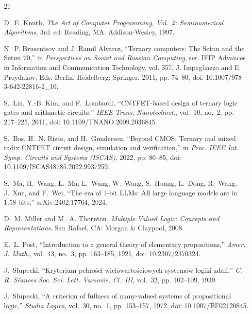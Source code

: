 \documentclass[conference]{IEEEtran}
\theoremstyle{remark}
\begin{document}
	\begin{thebibliography}{21}
		\providecommand{\url}[1]{#1}
		
		D.~E. Knuth, \emph{The Art of Computer Programming, Vol.~2: Seminumerical Algorithms}, 3rd~ed. Reading, MA: Addison-Wesley, 1997.
		
		N.~P. Brusentsov and J. Ramil Alvarez, ``Ternary computers: The Setun and the Setun 70,'' in \emph{Perspectives on Soviet and Russian Computing}, ser. IFIP Advances in Information and Communication Technology, vol. 357, J. Impagliazzo and E. Proydakov, Eds. Berlin, Heidelberg: Springer, 2011, pp. 74--80, doi: 10.1007/978-3-642-22816-2\_10.
		
		S.~Lin, Y.-B. Kim, and F.~Lombardi, ``{CNTFET}-based design of ternary logic gates and arithmetic circuits,'' \emph{IEEE Trans. Nanotechnol.}, vol.~10, no.~2, pp. 217--225, 2011, doi: 10.1109/TNANO.2009.2036845.
		
		S.~Bos, H.~N. Risto, and H.~Gundersen, ``Beyond {CMOS}: Ternary and mixed radix {CNTFET} circuit design, simulation and verification,'' in \emph{Proc. IEEE Int. Symp. Circuits and Systems (ISCAS)}, 2022, pp. 80--85, doi: 10.1109/ISCAS48785.2022.9937259.
		
		S.~Ma, H.~Wang, L.~Ma, L.~Wang, W.~Wang, S.~Huang, L.~Dong, R.~Wang, J.~Xue, and F.~Wei, ``The era of 1-bit {LLMs}: {A}ll large language models are in 1.58 bits,'' arXiv:2402.17764, 2024.
		
		D.~M. Miller and M.~A. Thornton, \emph{Multiple Valued Logic: Concepts and Representations}. San Rafael, CA: Morgan \& Claypool, 2008.
		
		E.~L. Post, ``Introduction to a general theory of elementary propositions,'' \emph{Amer. J. Math.}, vol.~43, no.~3, pp. 163--185, 1921, doi: 10.2307/2370324.
		
		J.~S{\l}upecki, ``Kryterium pe{\l}no{\'s}ci wielowarto{\'s}ciowych system{\'o}w logiki zda{\'n},'' \emph{C. R. S{\'e}ances Soc. Sci. Lett. Varsovie, Cl.\ III}, vol.~32, pp. 102--109, 1939.
		
		J.~S{\l}upecki, ``A criterion of fullness of many-valued systems of propositional logic,'' \emph{Studia Logica}, vol.~30, no.~1, pp. 153--157, 1972, doi: 10.1007/BF02120845.
		

\end{thebibliography}
\end{document}
